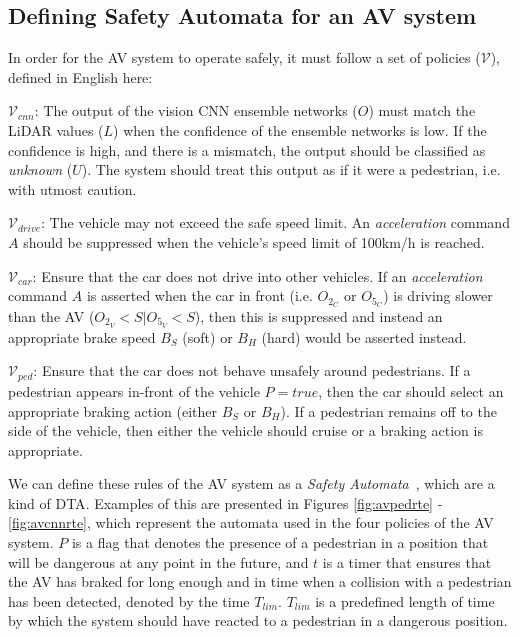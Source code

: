 \subsection{Defining Safety Automata for an \ac{AV} system}
In order for the \ac{AV} system to operate safely, it must follow a set of policies ($\mathcal{V}$), defined in English here:

$\mathcal{V}_{cnn}$: The output of the vision \ac{CNN} ensemble networks ($O$) must match the \ac{LiDAR} values ($L$) when the confidence of the ensemble networks is low. 
If the confidence is high, and there is a mismatch, the output should be classified as \textit{unknown} ($U$).
The system should treat this output as if it were a pedestrian, i.e. with utmost caution.

$\mathcal{V}_{drive}$: The vehicle may not exceed the safe speed limit. 
An \textit{acceleration} command $A$ should be suppressed when the vehicle's speed limit of 100km/h is reached.

$\mathcal{V}_{car}$: Ensure that the car does not drive into other vehicles. If an \textit{acceleration} command $A$ is asserted when the car in front (i.e. $O_{2_C}$ or $O_{5_C}$) is driving slower than the \ac{AV} ($O_{2_V}<S|O_{5_V}<S$), then this is suppressed and instead an appropriate brake speed $B_S$ (soft) or $B_H$ (hard) would be asserted instead.

$\mathcal{V}_{ped}$: Ensure that the car does not behave unsafely around pedestrians. If a pedestrian appears in-front of the vehicle $P=true$, then the car should select an appropriate braking action (either $B_S$ or $B_H$). If a pedestrian remains off to the side of the vehicle, then either the vehicle should cruise or a braking action is appropriate.

We can define these rules of the \ac{AV} system as a \textit{Safety Automata}~\cite{recps}, which are a kind of \acf{DTA}. 
Examples of this are presented in Figures \ref{fig:avpedrte} - \ref{fig:avcnnrte}, which represent the automata used in the four policies of the \ac{AV} system.
$P$ is a flag that denotes the presence of a pedestrian in a position that will be dangerous at any point in the future, and $t$ is a timer that ensures that the \ac{AV} has braked for long enough and in time when a collision with a pedestrian has been detected, denoted by the time $T_{lim}$. 
$T_{lim}$ is a predefined length of time by which the system should have reacted to a pedestrian in a dangerous position.


